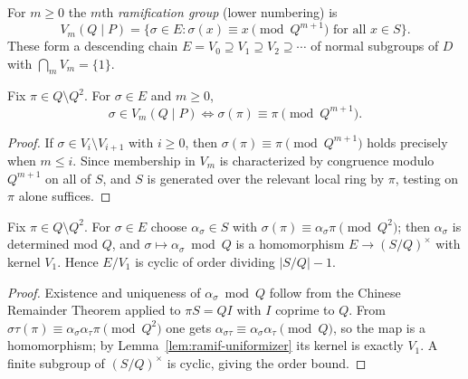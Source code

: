\begin{definition}
  \label{def:ramification-groups}
  For $m \ge 0$ the $m$th \emph{ramification group} (lower numbering) is
  \[
    V_m(Q \mid P) = \{\sigma \in E : \sigma(x) \equiv x \pmod{Q^{m+1}}
      \text{ for all } x \in S\}.
  \]
  These form a descending chain $E = V_0 \supseteq V_1 \supseteq V_2 \supseteq
  \cdots$ of normal subgroups of $D$ with $\bigcap_m V_m = \{1\}$.
\end{definition}

\begin{lemma}
  \label{lem:ramif-uniformizer}
  Fix $\pi \in Q \setminus Q^2$. For $\sigma \in E$ and $m \ge 0$,
  \[
    \sigma \in V_m(Q \mid P) \iff \sigma(\pi) \equiv \pi \pmod{Q^{m+1}}.
  \]
\end{lemma}
\begin{proof}
  If $\sigma \in V_i \setminus V_{i+1}$ with $i \ge 0$, then $\sigma(\pi)
  \equiv \pi \pmod{Q^{m+1}}$ holds precisely when $m \le i$. Since membership in
  $V_m$ is characterized by congruence modulo $Q^{m+1}$ on all of $S$, and $S$
  is generated over the relevant local ring by $\pi$, testing on $\pi$ alone
  suffices.
\end{proof}

\begin{lemma}
  \label{lem:tame-quotient}
  Fix $\pi \in Q \setminus Q^2$. For $\sigma \in E$ choose $\alpha_\sigma \in S$
  with $\sigma(\pi) \equiv \alpha_\sigma \pi \pmod{Q^2}$; then $\alpha_\sigma$ is
  determined mod $Q$, and $\sigma \mapsto \alpha_\sigma \bmod Q$ is a
  homomorphism $E \to (S/Q)^\times$ with kernel $V_1$. Hence $E/V_1$ is cyclic
  of order dividing $|S/Q| - 1$.
\end{lemma}
\begin{proof}
  Existence and uniqueness of $\alpha_\sigma \bmod Q$ follow from the Chinese
  Remainder Theorem applied to $\pi S = QI$ with $I$ coprime to $Q$. From
  $\sigma\tau(\pi) \equiv \alpha_\sigma \alpha_\tau \pi \pmod{Q^2}$ one gets
  $\alpha_{\sigma\tau} \equiv \alpha_\sigma \alpha_\tau \pmod{Q}$, so the map is
  a homomorphism; by Lemma~\ref{lem:ramif-uniformizer} its kernel is exactly
  $V_1$. A finite subgroup of $(S/Q)^\times$ is cyclic, giving the order bound.
\end{proof}


